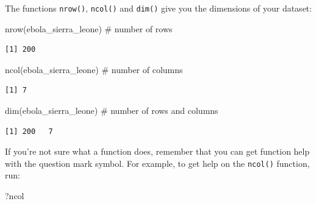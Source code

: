 \documentclass[
  letterpaper,
  DIV=11,
  numbers=noendperiod]{scrreprt}
\newenvironment{Shaded}{\begin{snugshade}}{\end{snugshade}}
\newcommand{\CommentTok}[1]{\textcolor[rgb]{0.37,0.37,0.37}{#1}}
\newcommand{\FunctionTok}[1]{\textcolor[rgb]{0.28,0.35,0.67}{#1}}
\newcommand{\NormalTok}[1]{\textcolor[rgb]{0.00,0.23,0.31}{#1}}
\begin{document}
The functions \texttt{nrow()}, \texttt{ncol()} and \texttt{dim()} give
you the dimensions of your dataset:

\begin{Shaded}
\begin{Highlighting}[]
\FunctionTok{nrow}\NormalTok{(ebola\_sierra\_leone) }\CommentTok{\# number of rows}
\end{Highlighting}
\end{Shaded}

\begin{verbatim}
[1] 200
\end{verbatim}

\begin{Shaded}
\begin{Highlighting}[]
\FunctionTok{ncol}\NormalTok{(ebola\_sierra\_leone) }\CommentTok{\# number of columns}
\end{Highlighting}
\end{Shaded}

\begin{verbatim}
[1] 7
\end{verbatim}

\begin{Shaded}
\begin{Highlighting}[]
\FunctionTok{dim}\NormalTok{(ebola\_sierra\_leone) }\CommentTok{\# number of rows and columns}
\end{Highlighting}
\end{Shaded}

\begin{verbatim}
[1] 200   7
\end{verbatim}

\begin{tcolorbox}[enhanced jigsaw, titlerule=0mm, colback=white, left=2mm, breakable, opacitybacktitle=0.6, colbacktitle=quarto-callout-note-color!10!white, colframe=quarto-callout-note-color-frame, bottomtitle=1mm, opacityback=0, coltitle=black, arc=.35mm, toptitle=1mm, title=\textcolor{quarto-callout-note-color}{\faInfo}\hspace{0.5em}{Reminder}, leftrule=.75mm, toprule=.15mm, bottomrule=.15mm, rightrule=.15mm]

If you're not sure what a function does, remember that you can get
function help with the question mark symbol. For example, to get help on
the \texttt{ncol()} function, run:

\begin{Shaded}
\begin{Highlighting}[]
\NormalTok{?ncol}
\end{Highlighting}
\end{Shaded}

\end{tcolorbox}
\end{document}
